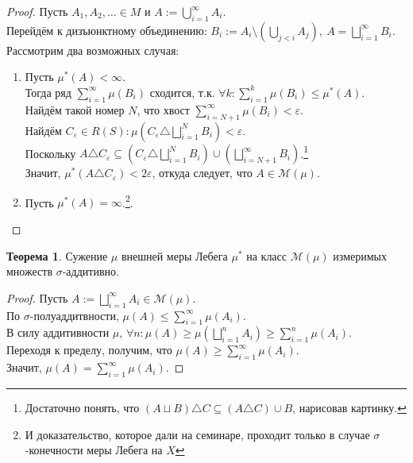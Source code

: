 \documentclass[11pt,a4paper]{report}
\def\eps{\varepsilon}
\theoremstyle{definition}
\theoremstyle{definition}
\newtheorem{theorem}{Теорема}[section]
\theoremstyle{definition}
\begin{document}
	\begin{proof}
		Пусть $ A_{1}, A_{2}, \dots \in M $  и $ A := \bigcup_{i=1}^{\infty}{A_{i}} $.\\
		Перейдём к дизъюнктному объединению: $ B_{i} := A_{i} \setminus \left (\bigcup_{j<i}{A_{j}}\right ),\ A = \bigsqcup_{i=1}^{\infty}{B_{i}} $.\\
		Рассмотрим два возможных случая:
		\begin{enumerate}
			\item Пусть $ \mu^{*}(A) < \infty $.\\ 
			Тогда ряд $ \sum_{i=1}^{\infty}{\mu(B_{i})} $ сходится, т.к. $ \forall k: \sum_{i=1}^{k}{\mu(B_{i})}  \le \mu^{*}(A) $.\\
			Найдём такой номер $ N $, что хвост $ \sum_{i=N+1}^{\infty}{\mu(B_{i})} < \eps $.\\ 
			Найдём $ C_{\eps} \in R(S): \mu\left (C_{\eps} \triangle \bigsqcup_{i=1}^{N}{B_{i}} \right ) < \eps $.\\
			Поскольку $ A \triangle C_{\eps} \subseteq \left (C_{\eps} \triangle \bigsqcup_{i=1}^{N}{B_{i}} \right ) \cup \left (\bigsqcup_{i=N+1}^{\infty}B_{i}\right ) $.\footnote{Достаточно понять, что $ (A \sqcup B) \triangle C \subseteq (A \triangle C) \cup B $, нарисовав картинку.}\\
			Значит, $ \mu^{*}(A \triangle C_{\eps}) < 2\eps $, откуда следует, что $ A \in \mathcal{M}(\mu) $.
			\item Пусть $ \mu^{*}(A) = \infty $.\footnote{И доказательство, которое дали на семинаре, проходит только в случае $ \sigma $-конечности меры Лебега на $ X $}.
		\end{enumerate}
	\end{proof}
	\begin{theorem}
		Сужение $ \mu $ внешней меры Лебега $ \mu^{*} $ на класс $ \mathcal{M}(\mu) $ измеримых множеств $ \sigma $-аддитивно.
	\end{theorem}
	\begin{proof}
		Пусть $ A := \bigsqcup_{i=1}^{\infty}{A_{i}} \in \mathcal{M}(\mu) $.\\
		По $ \sigma $-полуаддитвности, $ \mu(A) \le \sum_{i=1}^{\infty}{\mu(A_{i})} $.\\
		В силу аддитивности $ \mu $, $ \forall n: \mu(A) \ge \mu\left (\bigsqcup_{i=1}^{n}{A_{i}}\right )  \ge \sum_{i=1}^{n}{\mu(A_{i})} $.\\ 
		Переходя к пределу, получим, что $ \mu(A) \ge \sum_{i=1}^{\infty}{\mu(A_{i})} $.\\
		Значит, $ \mu(A) = \sum_{i=1}^{\infty}{\mu(A_{i})} $.
	\end{proof}
\end{document}
